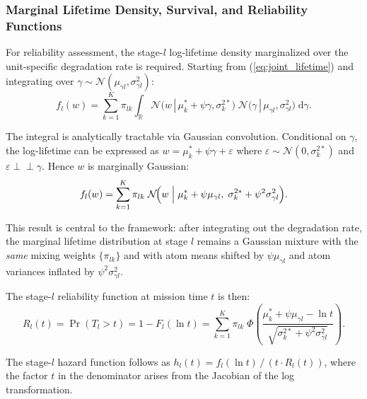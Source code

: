 \documentclass[a4paper,fleqn,longmktitle]{cas-sc}
\newcommand{\indep}{\perp\!\!\!\perp}
\newcommand{\given}{\,|\,}
\newcommand{\normal}{\mathcal{N}}
\newcommand{\R}{\mathbb{R}}
\begin{document}
\subsubsection{Marginal Lifetime Density, Survival, and Reliability Functions}

For reliability assessment, the stage-$l$ log-lifetime density marginalized over the unit-specific degradation rate is required. Starting from (\ref{eq:joint_lifetime}) and integrating over $\gamma \sim \normal(\mu_{\gamma l}, \sigma_{\gamma l}^2)$:
\begin{equation}\label{eq:marginal_density_int}
    f_l(w) = \sum_{k=1}^{K} \pi_{lk} \int_{\R}
        \normal\!\bigl(w \given \mu_k^* + \psi\gamma, \sigma_k^{2*}\bigr) \;
        \normal\!\bigl(\gamma \given \mu_{\gamma l}, \sigma_{\gamma l}^2\bigr) \;\mathrm{d}\gamma.
\end{equation}

The integral is analytically tractable via Gaussian convolution. Conditional on $\gamma$, the log-lifetime can be expressed as $w = \mu_k^* + \psi\gamma + \varepsilon$ where $\varepsilon \sim \normal(0, \sigma_k^{2*})$ and $\varepsilon \indep \gamma$. Hence $w$ is marginally Gaussian:
\begin{equation}\label{eq:marginal_density}
    f_l(w) = \sum_{k=1}^{K} \pi_{lk} \;
        \normal\!\Bigl(w \;\Big\vert\; \mu_k^* + \psi\mu_{\gamma l}, \; \sigma_k^{2*} + \psi^2 \sigma_{\gamma l}^2\Bigr).
\end{equation}

This result is central to the framework: after integrating out the degradation rate, the marginal lifetime distribution at stage $l$ remains a Gaussian mixture with the \emph{same} mixing weights $\{\pi_{lk}\}$ and with atom means shifted by $\psi\mu_{\gamma l}$ and atom variances inflated by $\psi^2 \sigma_{\gamma l}^2$.

The stage-$l$ reliability function at mission time $t$ is then:
\begin{equation}\label{eq:reliability}
    R_l(t) = \Pr(T_l > t) = 1 - F_l(\ln t)
    = \sum_{k=1}^{K} \pi_{lk} \;
        \Phi\!\left(
            \frac{\mu_k^* + \psi\mu_{\gamma l} - \ln t}
                 {\sqrt{\sigma_k^{2*} + \psi^2 \sigma_{\gamma l}^2}}
        \right).
\end{equation}

The stage-$l$ hazard function follows as $h_l(t) = f_l(\ln t) \,/\, (t \cdot R_l(t))$, where the factor $t$ in the denominator arises from the Jacobian of the log transformation.
\end{document}
